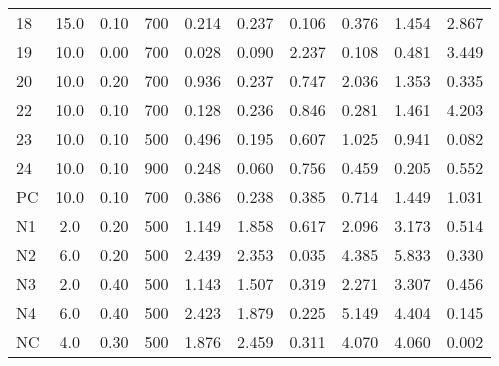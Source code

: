 \begin{longtable}{lccccccccc}
18 & 15.0 & 0.10 & 700 & 0.214 & 0.237 & 0.106 & 0.376 & 1.454 & 2.867 \\
19 & 10.0 & 0.00 & 700 & 0.028 & 0.090 & 2.237 & 0.108 & 0.481 & 3.449 \\
20 & 10.0 & 0.20 & 700 & 0.936 & 0.237 & 0.747 & 2.036 & 1.353 & 0.335 \\
22 & 10.0 & 0.10 & 700 & 0.128 & 0.236 & 0.846 & 0.281 & 1.461 & 4.203 \\
23 & 10.0 & 0.10 & 500 & 0.496 & 0.195 & 0.607 & 1.025 & 0.941 & 0.082 \\
24 & 10.0 & 0.10 & 900 & 0.248 & 0.060 & 0.756 & 0.459 & 0.205 & 0.552 \\
PC & 10.0 & 0.10 & 700 & 0.386 & 0.238 & 0.385 & 0.714 & 1.449 & 1.031 \\
N1 & 2.0 & 0.20 & 500 & 1.149 & 1.858 & 0.617 & 2.096 & 3.173 & 0.514 \\
N2 & 6.0 & 0.20 & 500 & 2.439 & 2.353 & 0.035 & 4.385 & 5.833 & 0.330 \\
N3 & 2.0 & 0.40 & 500 & 1.143 & 1.507 & 0.319 & 2.271 & 3.307 & 0.456 \\
N4 & 6.0 & 0.40 & 500 & 2.423 & 1.879 & 0.225 & 5.149 & 4.404 & 0.145 \\
NC & 4.0 & 0.30 & 500 & 1.876 & 2.459 & 0.311 & 4.070 & 4.060 & 0.002 \\
\end{longtable}
